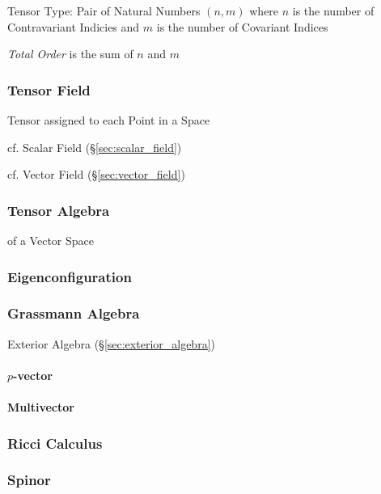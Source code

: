 Tensor Type: Pair of Natural Numbers $(n,m)$ where $n$ is the number
of Contravariant Indicies and $m$ is the number of Covariant Indices

\emph{Total Order} is the sum of $n$ and $m$



\subsubsection{Tensor Field}\label{sec:tensor_field}

Tensor assigned to each Point in a Space

cf. Scalar Field (\S\ref{sec:scalar_field})

cf. Vector Field (\S\ref{sec:vector_field})



\subsubsection{Tensor Algebra}\label{sec:tensor_algebra}

of a Vector Space



\subsubsection{Eigenconfiguration}\label{sec:eigenconfiguration}

\subsubsection{Grassmann Algebra}\label{sec:grassmann_algebra}

Exterior Algebra (\S\ref{sec:exterior_algebra})

\paragraph{$p$-vector}\label{sec:p_vector}\hfill

\paragraph{Multivector}\label{sec:multivector}\hfill


\subsubsection{Ricci Calculus}\label{sec:ricci_calculus}

\subsubsection{Spinor}\label{sec:spinor}



